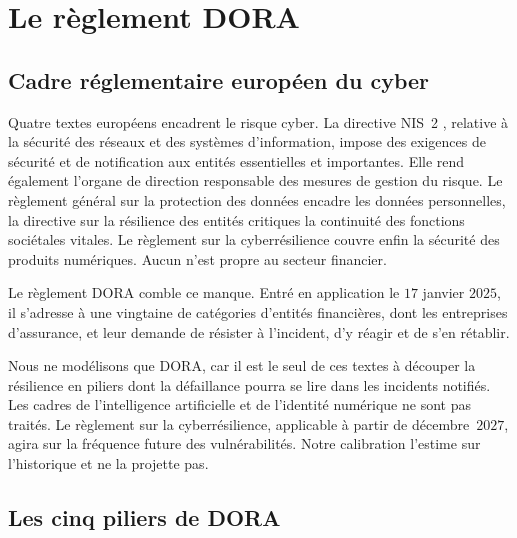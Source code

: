 \section{Le règlement DORA}
\label{sec:dora}

\subsection{Cadre réglementaire européen du cyber}
\label{subsec:cadre-reglementaire-europeen}

Quatre textes européens encadrent le risque cyber. La directive NIS~2
\citep{NIS2Directive2022}, relative à la sécurité des réseaux et des systèmes d'information, impose
des exigences de sécurité et de notification aux entités essentielles et importantes. Elle rend
également l'organe de direction responsable des mesures de gestion du risque. Le règlement général
sur la protection des données \citep{RGPD2016} encadre les données personnelles, la directive sur la
résilience des entités critiques \citep{REC2022} la continuité des fonctions sociétales vitales. Le
règlement sur la cyberrésilience \citep{CRA2024} couvre enfin la sécurité des produits numériques.
Aucun n'est propre au secteur financier.

Le règlement DORA \citep{DORA2022} comble ce manque. Entré en application le $17$ janvier $2025$, il
s'adresse à une vingtaine de catégories d'entités financières, dont les entreprises d'assurance, et
leur demande de résister à l'incident, d'y réagir et de s'en rétablir. 

Nous ne modélisons que DORA, car il est le seul de ces textes à découper la résilience en piliers
dont la défaillance pourra se lire dans les incidents notifiés. Les cadres de l'intelligence
artificielle et de l'identité numérique ne sont pas traités. Le règlement sur la cyberrésilience,
applicable à partir de décembre~$2027$, agira sur la fréquence future des vulnérabilités. Notre calibration l'estime sur l'historique et ne la projette pas.

\subsection{Les cinq piliers de DORA}
\label{subsec:cinq-piliers-dora}


